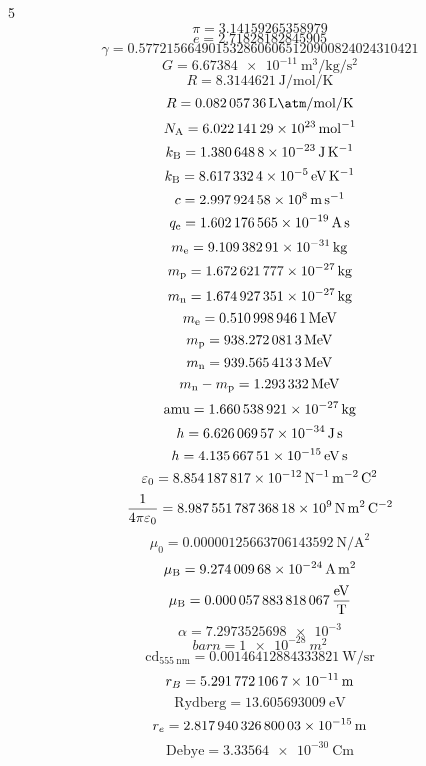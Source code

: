 \documentclass[a4paper]{article}
\newcommand*\titlet[1]{\textbf{\xmakefirstuc{#1}}}
\newenvironment{formulae}[2]{%
\vspace{-15pt}
\begin{multicols}{#1}
\noindent\titlet{#2}}
{\end{multicols}}
\begin{document}

\newcommand*\boltz{k_\text B}

\begin{formulae}{5}{constants, units}
	\[\pi=\num{3.14159265358979}\]
	\[e=\num{2.71828182845905}\]
	\[\gamma=\num{0.5772156649015328606065120900824024310421}\]
	\[G=\SI{6.67384e-11}{\m\cubed\per\kg\per\s\squared}\]
	\[R=\SI{8.3144621}{\J\per\mol\per\K}\]
	\[R=\SI{0.08205736}{\l\atm\per\mol\per\K}\]
	\[N_\text A=\SI{6.02214129 E+23}{\per\mol}\]
	\[\boltz=\SI{1.3806488 E-23}{\J\per\K}\]
	\[\boltz=\SI{8.6173324 E-5}{\eV\per\K}\]
	\[c=\SI{2.99792458 E+8}{\m\per\s}\]
	\[q_\text e=\SI{1.602176565 E-19}{\A\s}\]
	\[m_\text e=\SI{9.10938291 E-31}{\kg}\]
	\[m_\text p=\SI{1.672621777 E-27}{\kg}\]
	\[m_\text n=\SI{1.674927351 E-27}{\kg}\]
	\[m_\text e=\SI{0.5109989461}{\MeV}\]
	\[m_\text p=\SI{938.2720813}{\MeV}\]
	\[m_\text n=\SI{939.5654133}{\MeV}\]
	\[m_\text n-m_\text p=\SI{1.293332}{\MeV}\]
	\[\text{amu}=\SI{1.660538921 E-27}{\kg}\]
	\[h=\SI{6.62606957 E-34}{\J\s}\]
	\[h=\SI{4.13566751 E-15}{\eV\s}\]
	\[\varepsilon_0=\SI{8.854187817 E-12}{\per\newton\per\metre\squared\coulomb\squared}\]
	\[\frac1{4\pi\varepsilon_0}=\SI{8.98755178736818 E+9}{\newton\metre\squared\per\coulomb\squared}\]
	\[\mu_0=\SI{0.00000125663706143592}{\N\per\A\squared}\]
	\[\mu_\text B=\SI{9.27400968 E-24}{\A\m\squared}\]
	\[\mu_\text B=\SI{0.000057883818067}{\eV\over\tesla}\]
	\[\alpha=\num{7.2973525698e-3}\]
	\[\si{barn}=\SI{1e-28}{m^2}\]
	\[\si{\candela}_{\SI[scientific-notation=false]{555}{\nano\metre}}=\SI{0.00146412884333821}{\watt\per\steradian}\]
	\[r_B=\SI{5.2917721067 E-11}{\m}\]
	\[\text{Rydberg}=\SI{13.605693009}\eV\]
	\[r_e=\SI{2.81794032680003 E-15}{m}\]
	\[\mathrm{Debye}=\SI{3.33564e-30}{\coulomb\metre}\]
\end{formulae}
\end{document}

